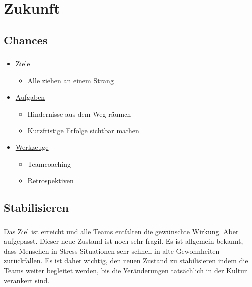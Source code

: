 \documentclass[aspectratio=169]{beamer}
\begin{document}
\section{Zukunft}
\subsection{Chances}
\begin{frame}
\frametitle{\subsecname}\framesubtitle{\secname}

\end{frame}

\begin{frame}
\frametitle{\subsecname}\framesubtitle{\secname}
\begin{itemize}
\setlength\itemsep{1em}
\item[\color{ipt-red}{\selectfont$\approx$}]\underline{Ziele}
\begin{itemize}
  \item Alle ziehen an einem Strang
\end{itemize}
\item[\color{ipt-red}{\selectfont$\approx$}]\underline{Aufgaben}
\begin{itemize}
\item Hindernisse aus dem Weg räumen
\item Kurzfristige Erfolge sichtbar machen
\end{itemize}
\item[\color{ipt-red}{\selectfont$\approx$}]\underline{Werkzeuge}
\begin{itemize}
  \item Teamcoaching
  \item Retrospektiven
\end{itemize}
\end{itemize}
\end{frame}

\subsection{Stabilisieren}
\begin{frame}
\frametitle{\subsecname}\framesubtitle{\secname}
Das Ziel ist erreicht und alle Teams entfalten die gewünschte Wirkung. Aber aufgepasst. Dieser neue Zustand ist noch sehr fragil. Es ist allgemein bekannt, dass Menschen in Stress-Situationen sehr schnell in alte Gewohnheiten zurückfallen. Es ist daher wichtig, den neuen Zustand zu stabilisieren indem die Teams weiter begleitet werden, bis die Veränderungen tatsächlich in der Kultur verankert sind.
\end{frame}
\end{document}
